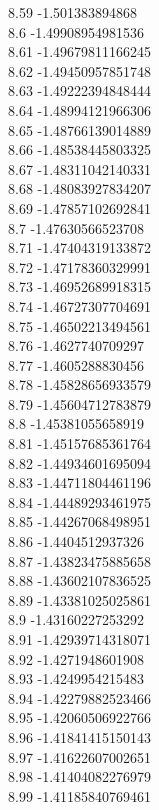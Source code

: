 {8.59	-1.501383894868\\
8.6	-1.49908954981536\\
8.61	-1.49679811166245\\
8.62	-1.49450957851748\\
8.63	-1.49222394848444\\
8.64	-1.48994121966306\\
8.65	-1.48766139014889\\
8.66	-1.48538445803325\\
8.67	-1.48311042140331\\
8.68	-1.48083927834207\\
8.69	-1.47857102692841\\
8.7	-1.47630566523708\\
8.71	-1.47404319133872\\
8.72	-1.47178360329991\\
8.73	-1.46952689918315\\
8.74	-1.46727307704691\\
8.75	-1.46502213494561\\
8.76	-1.4627740709297\\
8.77	-1.4605288830456\\
8.78	-1.45828656933579\\
8.79	-1.45604712783879\\
8.8	-1.45381055658919\\
8.81	-1.45157685361764\\
8.82	-1.44934601695094\\
8.83	-1.44711804461196\\
8.84	-1.44489293461975\\
8.85	-1.44267068498951\\
8.86	-1.4404512937326\\
8.87	-1.43823475885658\\
8.88	-1.43602107836525\\
8.89	-1.43381025025861\\
8.9	-1.43160227253292\\
8.91	-1.42939714318071\\
8.92	-1.4271948601908\\
8.93	-1.4249954215483\\
8.94	-1.42279882523466\\
8.95	-1.42060506922766\\
8.96	-1.41841415150143\\
8.97	-1.41622607002651\\
8.98	-1.41404082276979\\
8.99	-1.41185840769461\\
}
